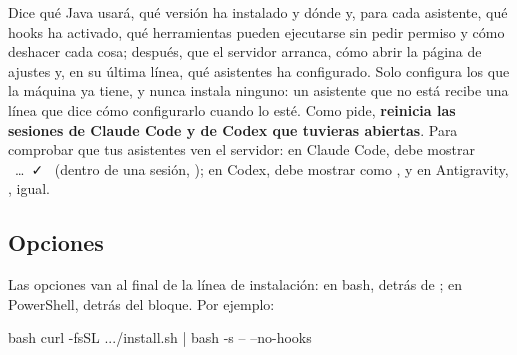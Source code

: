 \documentclass[11pt,a4paper]{article}
\begin{document}
Dice qué Java usará, qué versión ha instalado y dónde y, para cada asistente, qué hooks ha
activado, qué herramientas pueden ejecutarse sin pedir permiso y cómo deshacer
cada cosa; después, que el servidor arranca, cómo abrir la página de ajustes y, en su
última línea, qué asistentes ha configurado. Solo configura
los que la máquina ya tiene, y nunca instala ninguno: un asistente que no está
recibe una línea que dice cómo configurarlo cuando lo esté. Como pide,
\textbf{reinicia las sesiones de Claude Code y de Codex que tuvieras abiertas}.
Para comprobar que tus asistentes ven el servidor: en Claude Code,
 debe mostrar
~\ldots~\textcolor{pbtip}{\faCheck}~ (dentro de una
sesión, ); en Codex,  debe mostrar 
como , y en Antigravity, , igual.

\subsection{Opciones}

Las opciones van al final de la línea de instalación: en bash, detrás de
; en PowerShell, detrás del bloque. Por ejemplo:

\begin{command}{bash}
curl -fsSL .../install.sh | bash -s -- --no-hooks
\end{command}
\end{document}
